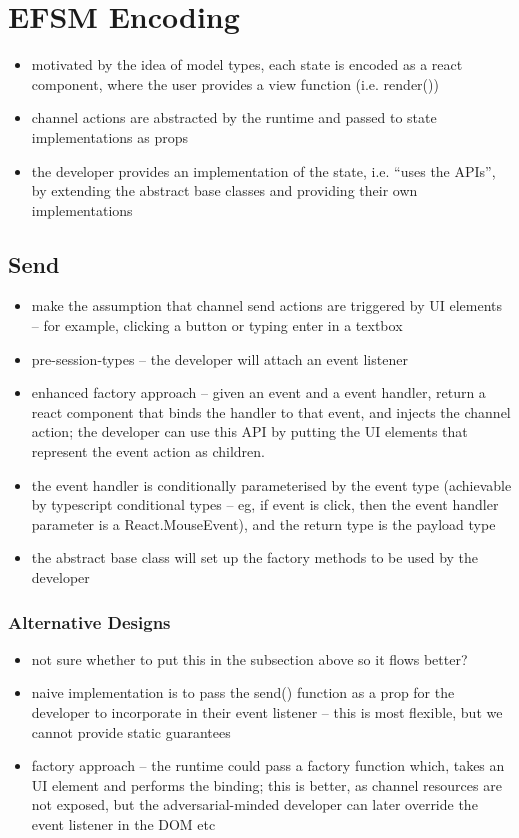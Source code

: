 \section{EFSM Encoding}
\label{section:reactefsm}

\begin{itemize}
\item motivated by the idea of model types, each state is encoded as a react component, where the user provides a view function (i.e. render())
\item channel actions are abstracted by the runtime and passed to state implementations as props
\item the developer provides an implementation of the state, i.e. ``uses the APIs'', by extending the abstract base classes and providing their own implementations
\end{itemize}

\subsection{Send}
\begin{itemize}
\item make the assumption that channel send actions are triggered by UI elements -- for example, clicking a button or typing enter in a textbox
\item pre-session-types -- the developer will attach an event listener
\item enhanced factory approach -- given an event and a event handler, return a react component that binds the handler to that event, and injects the channel action; the developer can use this API by putting the UI elements that represent the event action as children.
\item the event handler is conditionally parameterised by the event type (achievable by typescript conditional types -- eg, if event is click, then the event handler parameter is a React.MouseEvent), and the return type is the payload type
\item the abstract base class will set up the factory methods to be used by the developer
\end{itemize}

\subsubsection{Alternative Designs}
\begin{itemize}
\item not sure whether to put this in the subsection above so it flows better?
\item naive implementation is to pass the send() function as a prop for the developer to incorporate in their event listener -- this is most flexible, but we cannot provide static guarantees
\item factory approach -- the runtime could pass a factory function which, takes an UI element and performs the binding; this is better, as channel resources are not exposed, but the adversarial-minded developer can later override the event listener in the DOM etc
\end{itemize}


